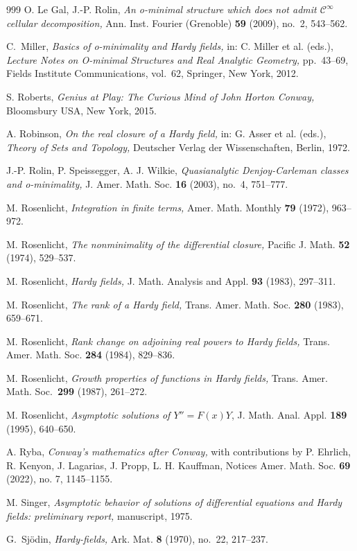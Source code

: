 \documentclass[]{amsart}
\numberwithin{equation}{section}
\theoremstyle{definition}
\theoremstyle{remark}
\begin{document}
\begin{thebibliography}{999}
O. Le Gal, J.-P. Rolin,  {\it 
An o-minimal structure which does not admit $\mathcal C^\infty$ cellular decomposition,} Ann. Inst. Fourier (Grenoble) {\bf 59} (2009), no.~2, 543--562. 

C.~Miller, \textit{Basics of o-minimality and Hardy fields,} in:  C. Miller et al. (eds.), \textit{Lecture Notes on O-minimal Structures and Real Analytic Geometry,} pp.~43--69, Fields Institute Communications, vol.~62, Springer, New York, 2012.



S. Roberts, {\em Genius at Play:  The Curious Mind of John Horton Conway,}
Bloomsbury USA, New York, 2015.

 A. Robinson, {\em On the real closure of a Hardy field,}
in: G. Asser et al. (eds.), {\em Theory of Sets and Topology,}
Deutscher Verlag der Wissenschaften, Berlin, 1972.


J.-P. Rolin, P. Speissegger, A. J. Wilkie, {\it Quasianalytic Denjoy-Carleman classes and o-minimality,} J. Amer. Math. Soc. {\bf 16} (2003), no.~4, 751--777. 

M. Rosenlicht, \textit{Integration in finite terms,} Amer. Math. Monthly {\bf 79} (1972), 963--972.
   
M. Rosenlicht, {\it The nonminimality of the differential closure,}
Pacific J. Math. {\bf 52} (1974), 529--537.

M. Rosenlicht, {\em Hardy fields,} J. Math. Analysis and Appl. {\bf 93} (1983), 297--311.

M. Rosenlicht, {\em The rank of a Hardy field,} Trans. Amer. Math. Soc. {\bf 280} (1983), 659--671.
 

M. Rosenlicht, {\em Rank change on adjoining real powers to Hardy fields,} Trans. Amer. Math. Soc. {\bf 284} (1984), 829--836.

M. Rosenlicht, {\em Growth properties of functions in Hardy fields,} Trans. Amer. Math. Soc.~{\bf 299} (1987), 261--272.

M. Rosenlicht, {\em Asymptotic solutions of ${Y}''={F}(x){Y}$}, J. Math. Anal. Appl. {\bf 189} (1995), 640--650.

A. Ryba, {\em Conway's mathematics after Conway,}
with contributions by P. Ehrlich, R. Kenyon, J. Lagarias, J. Propp, L. H. Kauffman,
Notices Amer. Math. Soc. {\bf 69} (2022), no. 7, 1145--1155.

M. Singer, \textit{Asymptotic behavior of solutions of differential equations and Hardy fields: preliminary report,}  manuscript, 1975.

 G.~Sj{\"o}din, \textit{Hardy-fields,} Ark. Mat. {\bf 8} (1970), no.~22, 217--237.
 
\end{thebibliography}
\end{document}
